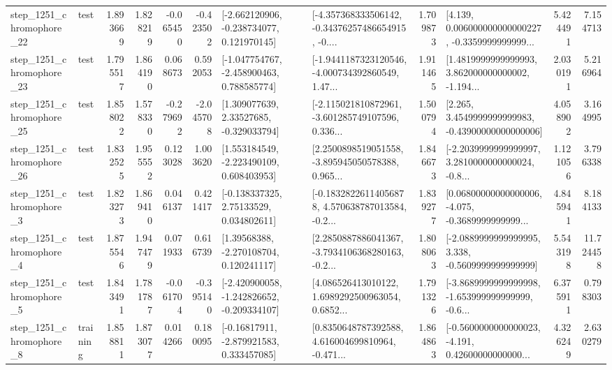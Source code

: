 \begin{tabular}{llrrrrllrlrr}
 step\_1251\_chromophore\_22 &      test &      1.893669 &    1.828219 &     -0.065450 & -0.423502 &   [-2.662120906, -0.238734077, 0.121970145] &  [-4.357368333506142, -0.34376257486654915, -0.... &       1.709873 &  [4.139, 0.006000000000000227, -0.3359999999999... &            5.424491 &          7.154713 \\
 step\_1251\_chromophore\_23 &      test &      1.795517 &    1.864190 &      0.068673 &  0.592053 &   [-1.047754767, -2.458900463, 0.788585774] &  [-1.9441187323120546, -4.000734392860549, 1.47... &       1.911465 &  [1.4819999999999993, 3.862000000000002, -1.194... &            2.030191 &          5.216964 \\
 step\_1251\_chromophore\_25 &      test &      1.858022 &    1.578330 &     -0.279692 & -2.045708 &     [1.309077639, 2.33527685, -0.329033794] &  [-2.115021810872961, -3.601285749107596, 0.336... &       1.500794 &  [2.265, 3.4549999999999983, -0.43900000000000006] &            4.058902 &          3.164995 \\
 step\_1251\_chromophore\_26 &      test &      1.832525 &    1.955552 &      0.123028 &  1.003620 &    [1.553184549, -2.223490109, 0.608403953] &  [2.2500898519051558, -3.895945050578388, 0.965... &       1.846673 &  [-2.2039999999999997, 3.2810000000000024, -0.8... &            1.121056 &          3.796338 \\
  step\_1251\_chromophore\_3 &      test &      1.823273 &    1.869410 &      0.046137 &  0.421417 &     [-0.138337325, 2.75133529, 0.034802611] &  [-0.18328226114056878, 4.570638787013584, -0.2... &       1.839277 &  [0.06800000000000006, -4.075, -0.3689999999999... &            4.845941 &          8.184133 \\
  step\_1251\_chromophore\_4 &      test &      1.875546 &    1.947479 &      0.071933 &  0.616739 &     [1.39568388, -2.270108704, 0.120241117] &  [2.2850887886041367, -3.7934106368280163, -0.2... &       1.808063 &  [-2.0889999999999995, 3.338, -0.5609999999999999] &            5.543198 &         11.724458 \\
  step\_1251\_chromophore\_5 &      test &      1.843491 &    1.781787 &     -0.061704 & -0.395140 &  [-2.420900058, -1.242826652, -0.209334107] &  [4.086526413010122, 1.6989292500963054, 0.6852... &       1.791326 &  [-3.8689999999999998, -1.653999999999999, -0.6... &            6.375911 &          0.798303 \\
  step\_1251\_chromophore\_8 &  training &      1.858811 &    1.873077 &      0.014266 &  0.180095 &    [-0.16817911, -2.879921583, 0.333457085] &  [0.8350648787392588, 4.616004699810964, -0.471... &       1.864863 &  [-0.5600000000000023, -4.191, 0.42600000000000... &            4.326249 &          2.630279 \\

\end{tabular}
